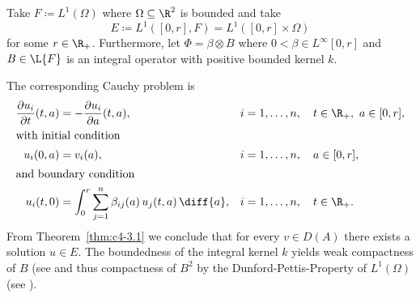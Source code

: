 \begin{example}\label{ex:c4-3.13}
%
Take $F \coloneq L^{1}(\Omega)$ where $\Omega \subseteq \R^{2}$ is bounded and take
%
\[
	 E \coloneq L^{1}([0,r], F) = L^{1}([0,r] \times \Omega)
\]
%
for some $r \in \R_{+}$.
Furthermore, let $\Phi = \beta \otimes B$ where $0 < \beta \in L^{\infty}[0,r]$ and $B \in \L{F}$ is an integral operator with positive bounded kernel $k$.

The corresponding Cauchy problem is
\begin{align}
\frac{\partial u_i}{\partial t}(t,a)
    &= -\frac{\partial u_i}{\partial a}(t,a),
    && i=1,\ldots,n,\quad t\in\R_+,\ a\in[0,r], \notag\\
\intertext{with initial condition}
u_i(0,a)
    &= v_i(a),
    && i=1,\ldots,n,\quad a\in[0,r], \label{eq:c4-3.14}\\
\intertext{and boundary condition}
u_i(t,0)
    &= \int_0^r \sum_{j=1}^n \beta_{ij}(a)\,u_j(t,a)\,\diff{a},
    && i=1,\ldots,n,\quad t\in\R_+. \notag
\end{align}
From Theorem~\ref{thm:c4-3.1} we conclude that for every $v \in D(A)$ there exists a solution $u \in E$.
The boundedness of the integral kernel $k$ yields weak compactness of\/ $B$ (see \textcite[Section II.5]{schaefer:1974} and thus compactness of\/ $B^{2}$ by the Dunford-Pettis-Property of\/ $L^{1}(\Omega)$ (see \textcite[Chapter II, Theorem.9.9]{schaefer:1974}).


\end{example}
